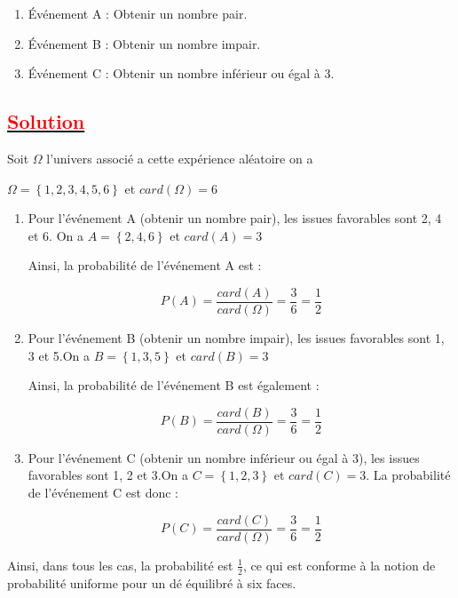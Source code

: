 \documentclass[12pt]{article}
\begin{document}
\begin{enumerate}
    \item Événement A : Obtenir un nombre pair.
    \item Événement B : Obtenir un nombre impair.
    \item Événement C : Obtenir un nombre inférieur ou égal à 3.
\end{enumerate}

\subsection*{\underline{\textbf{\textcolor{red}{Solution}}}}
Soit $\Omega$ l'univers associé a cette expérience aléatoire on a

$\Omega=\left\lbrace 1, 2, 3, 4, 5, 6 \right\rbrace $ et $card(\Omega)=6$ 

\begin{enumerate}
    \item Pour l'événement A (obtenir un nombre pair), les issues favorables sont 2, 4 et 6.
      On a $A=\left\lbrace 2, 4, 6 \right\rbrace $ et $card(A)=3$
          
     Ainsi, la probabilité de l'événement A est :
    
    \[ P(A) =\frac{card(A)}{card(\Omega)}=\frac{3}{6} = \frac{1}{2} \]
    
    \item Pour l'événement B (obtenir un nombre impair), les issues favorables sont 1, 3 et 5.On a $B=\left\lbrace 1, 3, 5 \right\rbrace $ et $card(B)=3$
    
     Ainsi, la probabilité de l'événement B est également :
    
    \[ P(B) =\frac{card(B)}{card(\Omega)}=\frac{3}{6} = \frac{1}{2} \]
    
    \item Pour l'événement C (obtenir un nombre inférieur ou égal à 3), les issues favorables sont 1, 2 et 3.On a $C=\left\lbrace 1, 2, 3 \right\rbrace $ et $card(C)=3$.
    La probabilité de l'événement C est donc :
    
    \[ P(C) =\frac{card(C)}{card(\Omega)}=\frac{3}{6} = \frac{1}{2} \]
\end{enumerate}

Ainsi, dans tous les cas, la probabilité est $\frac{1}{2}$, ce qui est conforme à la notion de probabilité uniforme pour un dé équilibré à six faces.
\end{document}
